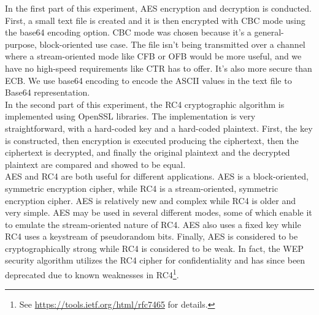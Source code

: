 \documentclass{article}
\begin{document}
In the first part of this experiment, AES encryption and decryption is conducted. First, a small text file is created and it is then
encrypted with CBC mode using the base64 encoding option. CBC mode was chosen because it's a general-purpose, block-oriented use case.
The file isn't being transmitted over a channel where a stream-oriented mode like CFB or OFB would be more useful, and we have no
high-speed requirements like CTR has to offer. It's also more secure than ECB. We use base64 encoding to encode the ASCII values in the
text file to Base64 representation.
\\[12pt]
In the second part of this experiment, the RC4 cryptographic algorithm is implemented using OpenSSL libraries. The implementation is very
straightforward, with a hard-coded key and a hard-coded plaintext. First, the key is constructed, then encryption is executed producing the
ciphertext, then the ciphertext is decrypted, and finally the original plaintext and the decrypted plaintext are compared and showed to be
equal.
\\[12pt]
AES and RC4 are both useful for different applications. AES is a block-oriented, symmetric encryption cipher, while RC4 is a
stream-oriented, symmetric encryption cipher. AES is relatively new and complex while RC4 is older and very simple. AES may be used in
several different modes, some of which enable it to emulate the stream-oriented nature of RC4. AES also uses a fixed key while RC4 uses a
keystream of pseudorandom bits. Finally, AES is considered to be cryptographically strong while RC4 is considered to be weak. In fact, the
WEP security algorithm utilizes the RC4 cipher for confidentiality and has since been deprecated due to known weaknesses in
RC4\footnote{See \url{https://tools.ietf.org/html/rfc7465} for details.}.
\end{document}
